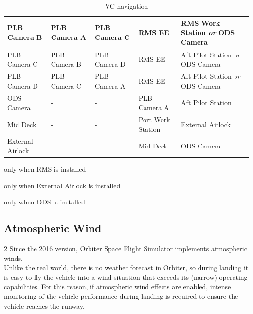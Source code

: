 \documentclass[Space_Shuttle_Vessel_Manual.tex]{subfiles}
\begin{document}
\begin{table}[H]
\begin{threeparttable}
\begin{tabular}{l|p{2.88cm} p{2.88cm} p{2.88cm} p{2.88cm} }
	\hline\rule{0pt}{2ex}
	PLB Camera B & PLB Camera A & PLB Camera C & RMS EE\tnote{a,c} & RMS Work Station \textit{or} ODS Camera\tnote{c}\\
	\hline\rule{0pt}{2ex}
	PLB Camera C & PLB Camera B & PLB Camera D & RMS EE\tnote{a,c} & Aft Pilot Station \textit{or} ODS Camera\tnote{c}\\
	\hline\rule{0pt}{2ex}
	PLB Camera D & PLB Camera C & PLB Camera A & RMS EE\tnote{a,c} & Aft Pilot Station \textit{or} ODS Camera\tnote{c}\\
	\hline\rule{0pt}{2ex}
	ODS Camera\tnote{c} & - & - & PLB Camera A & Aft Pilot Station\\
	\hline\rule{0pt}{2ex}
	Mid Deck & - & - & Port Work Station & External Airlock\tnote{b}\\
	\hline\rule{0pt}{2ex}
	External Airlock\tnote{b} & - & - & Mid Deck & ODS Camera\tnote{c}\\
  \end{tabular}
	\begin{tablenotes}
		\item[a] only when RMS is installed
		\item[b] only when External Airlock is installed
		\item[c] only when ODS is installed
	\end{tablenotes}
	\end{threeparttable}
  \caption{VC navigation}
  \label{tab:VC_navigation}
\end{table}
\newpage


\subsection{Atmospheric Wind}
\begin{multicols*}{2}
\noindent
Since the 2016 version, Orbiter Space Flight Simulator implements atmospheric winds.\\
Unlike the real world, there is no weather forecast in Orbiter, so during landing it is easy to fly the vehicle into a wind situation that exceeds its (narrow) operating capabilities. For this reason, if atmospheric wind effects are enabled, intense monitoring of the vehicle performance during landing is required to ensure the vehicle reaches the runway.\\
\end{multicols*}
\newpage
\end{document}
